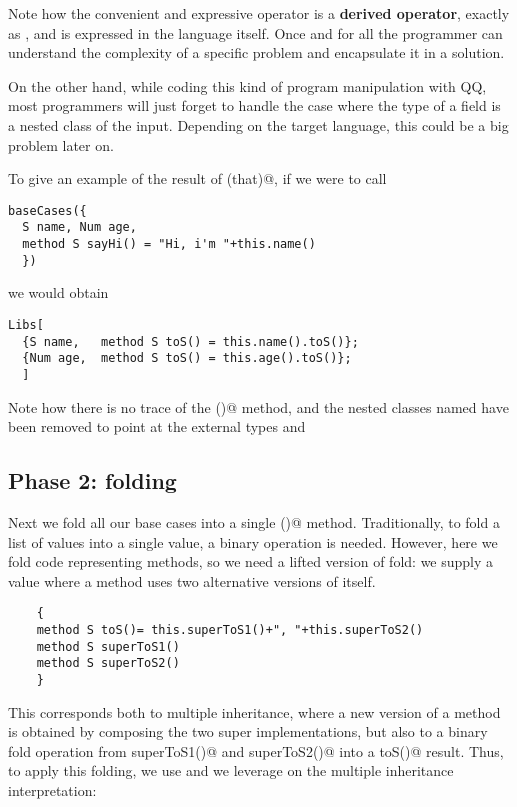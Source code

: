  Note how the convenient and expressive operator \Q@RedirectType@ is a \textbf{derived operator},
 exactly as \Q@Stringable@,
 and is expressed in the language itself. Once and for all the programmer can understand
 the complexity of a specific problem and encapsulate it in a solution.

 On the other hand, while coding this kind of program manipulation with QQ, most programmers
 will just forget to handle the case where the type of a field is a nested class of the input.
 Depending on the target language, this could be a big problem later on.


\noindent
To give an example of the result of \Q@baseCases(that)@, if we were to call 

\begin{lstlisting}
baseCases({
  S name, Num age,
  method S sayHi() = "Hi, i'm "+this.name()
  })
\end{lstlisting}

 we would obtain

\begin{lstlisting}
Libs[
  {S name,   method S toS() = this.name().toS()};
  {Num age,  method S toS() = this.age().toS()};
  ]
\end{lstlisting}

\noindent
Note how there is no trace of the \Q@sayHi()@ method, and the
nested classes named \Q@T@ have been removed to point at the
external types \Q@S@ and \Q@Num@


\subsection*{Phase 2: folding}
Next we fold all our base cases into a single \Q@toS()@ method.
Traditionally, to fold a list of values into a single value, a binary operation is needed.
However, here we fold code representing methods,
so we need a lifted version of fold:
 we supply a \Q@Library@ value where a method
uses two alternative versions of itself. 

\begin{lstlisting}
    {
    method S toS()= this.superToS1()+", "+this.superToS2()
    method S superToS1()
    method S superToS2()
    }
\end{lstlisting}

This corresponds both to multiple inheritance, where a new version of a method is obtained by composing the two super implementations,
but also to a binary fold operation from \Q@S superToS1()@ and \Q@S superToS2()@
into a \Q@S toS()@ result.
Thus, to apply this folding, we use \Q@Override@ and we leverage on the multiple inheritance interpretation:

